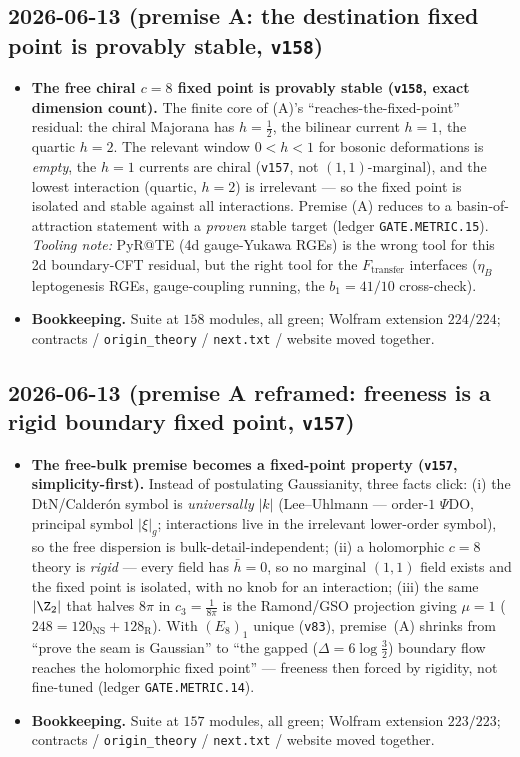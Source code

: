 \documentclass[11pt]{article}
\providecommand{\vref}[1]{\texttt{#1}}
\providecommand{\cthree}{c_3}\providecommand{\phiz}{\varphi_0^{\mathrm{ret}}}
\begin{document}
\subsection*{2026-06-13 (premise A: the destination fixed point is provably stable, \vref{v158})}
\begin{itemize}
\item \textbf{The free chiral $c{=}8$ fixed point is provably stable (\vref{v158}, exact dimension count).}
  The finite core of (A)'s ``reaches-the-fixed-point'' residual: the chiral Majorana has $h{=}\tfrac12$,
  the bilinear current $h{=}1$, the quartic $h{=}2$. The relevant window $0<h<1$ for bosonic deformations
  is \emph{empty}, the $h{=}1$ currents are chiral (\vref{v157}, not $(1,1)$-marginal), and the lowest
  interaction (quartic, $h{=}2$) is irrelevant --- so the fixed point is isolated and stable against all
  interactions. Premise (A) reduces to a basin-of-attraction statement with a \emph{proven} stable target
  (ledger \texttt{GATE.METRIC.15}). \emph{Tooling note:} PyR@TE (4d gauge-Yukawa RGEs) is the wrong tool
  for this 2d boundary-CFT residual, but the right tool for the $F_{\mathrm{transfer}}$ interfaces
  ($\eta_B$ leptogenesis RGEs, gauge-coupling running, the $b_1{=}41/10$ cross-check).
\item \textbf{Bookkeeping.} Suite at $158$ modules, all green; Wolfram extension $224/224$;
  contracts / \texttt{origin\_theory} / \texttt{next.txt} / website moved together.
\end{itemize}

\subsection*{2026-06-13 (premise A reframed: freeness is a rigid boundary fixed point, \vref{v157})}
\begin{itemize}
\item \textbf{The free-bulk premise becomes a fixed-point property (\vref{v157}, simplicity-first).}
  Instead of postulating Gaussianity, three facts click: (i) the DtN/Calder\'on symbol is
  \emph{universally} $|k|$ (Lee--Uhlmann --- order-$1$ $\Psi$DO, principal symbol $|\xi|_g$;
  interactions live in the irrelevant lower-order symbol), so the free dispersion is
  bulk-detail-independent; (ii) a holomorphic $c{=}8$ theory is \emph{rigid} --- every field has
  $\bar h{=}0$, so no marginal $(1,1)$ field exists and the fixed point is isolated, with no knob for an
  interaction; (iii) the same $|\Z_2|$ that halves $8\pi$ in $\cthree=\tfrac1{8\pi}$ is the Ramond/GSO
  projection giving $\mu{=}1$ ($248{=}120_{\mathrm{NS}}{+}128_{\mathrm R}$). With $(E_8)_1$ unique
  (\vref{v83}), premise~(A) shrinks from ``prove the seam is Gaussian'' to ``the gapped
  ($\Delta{=}6\log\tfrac32$) boundary flow reaches the holomorphic fixed point'' --- freeness then forced
  by rigidity, not fine-tuned (ledger \texttt{GATE.METRIC.14}).
\item \textbf{Bookkeeping.} Suite at $157$ modules, all green; Wolfram extension $223/223$;
  contracts / \texttt{origin\_theory} / \texttt{next.txt} / website moved together.
\end{itemize}
\end{document}

